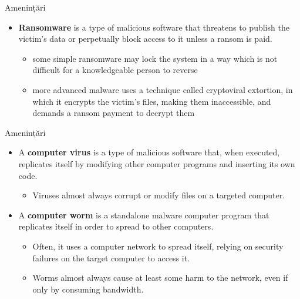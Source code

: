 \documentclass[pdf]{beamer}
\begin{document}
\begin{frame}{Amenințări}
\begin{itemize}
\item
\textbf{Ransomware} is a type of malicious software that threatens to publish the victim's data or perpetually block access to it unless a ransom is paid. 
\begin{itemize}
\item
some simple ransomware may lock the system in a way which is not difficult for a knowledgeable person to reverse
\item
more advanced malware uses a technique called cryptoviral extortion, in which it encrypts the victim's files, making them inaccessible, and demands a ransom payment to decrypt them
\end{itemize}
\end{itemize}
\end{frame}



\begin{frame}{Amenințări}
\begin{itemize}
\item
A \textbf{computer virus} is a type of malicious software that, when executed, replicates itself by modifying other computer programs and inserting its own code.
\begin{itemize}
\item
Viruses almost always corrupt or modify files on a targeted computer.
\end{itemize}

\item
A \textbf{computer worm} is a standalone malware computer program that replicates itself in order to spread to other computers.
\begin{itemize}
\item
Often, it uses a computer network to spread itself, relying on security failures on the target computer to access it. 
\item
Worms almost always cause at least some harm to the network, even if only by consuming bandwidth.
\end{itemize}
\end{itemize}
\end{frame}
\end{document}
